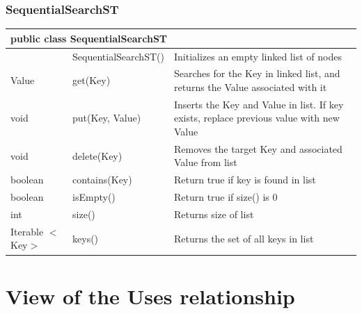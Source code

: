 \documentclass[12pt]{article}
\begin{document}
\bigskip


\subsubsection{SequentialSearchST}
\begin{center}
\begin{tabular}{p{0.1\hsize}|p{0.25\hsize}|p{0.50\hsize}}
\multicolumn{3}{l}{\textbf{public class SequentialSearchST}} \\
\hline
& SequentialSearchST() & Initializes an empty linked list of nodes\\
\hline
Value & get(Key) & Searches for the Key in linked list, and returns the Value associated with it \\
\hline
void & put(Key, Value) & Inserts the Key and Value in list. If key exists, replace previous value with new Value \\
\hline
void & delete(Key) & Removes the target Key and associated Value from list \\
\hline
boolean & contains(Key) & Return true if key is found in list \\
\hline
boolean & isEmpty() & Return true if size() is 0 \\
\hline
int & size() & Returns size of list \\
\hline
Iterable $<$Key$>$ & keys() & Returns the set of all keys in list \\
\hline
\end{tabular}
\end{center}

\newpage
\section{View of the Uses relationship}
\end{document}
